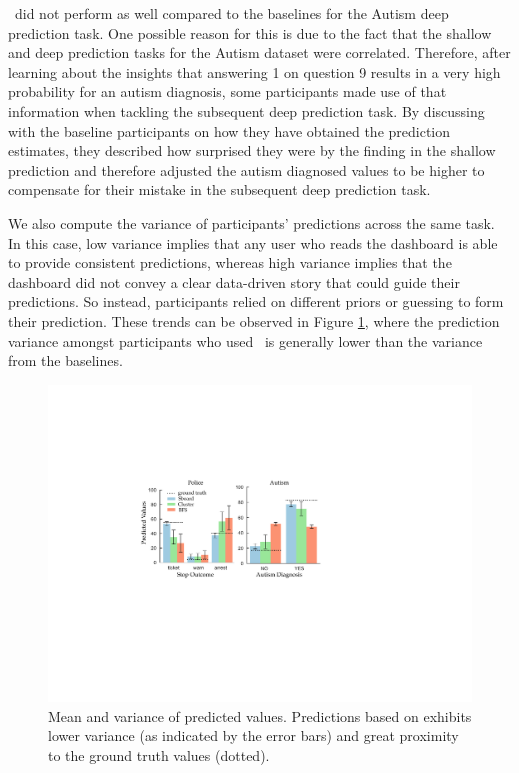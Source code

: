 \par \system\ did not perform as well compared to the baselines for the Autism deep prediction task. One possible reason for this is due to the fact that the shallow and deep prediction tasks for the Autism dataset were correlated. Therefore, after learning about the insights that answering 1 on question 9 results in a very high probability for an autism diagnosis, some participants made use of that information when tackling the subsequent deep prediction task. By discussing with the baseline participants on how they have obtained the prediction estimates, they described how surprised they were by the finding in the shallow prediction and therefore adjusted the autism diagnosed values to be higher to compensate for their mistake in the subsequent deep prediction task.
\par We also compute the variance of participants' predictions across the same task. In this case, low variance implies that any user who reads the dashboard is able to provide consistent predictions, whereas high variance implies that the dashboard did not convey a clear data-driven story that could guide their predictions. So instead, participants relied on different priors or guessing to form their prediction. These trends can be observed in Figure \ref{fig:actual_predictions}, where the prediction variance amongst participants who used \system\ is generally lower than the variance from the baselines.
\begin{figure}[h!]
\centering
\includegraphics[width=0.8\linewidth]{figures/prediction.pdf}
\caption{Mean and variance of predicted values. Predictions based on \system exhibits lower variance (as indicated by the error bars) and great proximity to the ground truth values (dotted).}
\label{fig:actual_predictions}
\end{figure}
